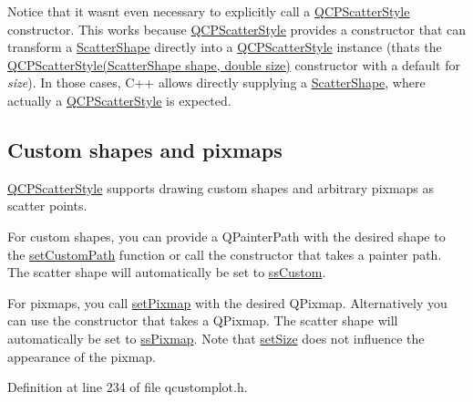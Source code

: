 \begin{DoxyCodeInclude}
\end{DoxyCodeInclude}
 Notice that it wasn\textquotesingle{}t even necessary to explicitly call a \hyperlink{class_q_c_p_scatter_style}{Q\+C\+P\+Scatter\+Style} constructor. This works because \hyperlink{class_q_c_p_scatter_style}{Q\+C\+P\+Scatter\+Style} provides a constructor that can transform a \hyperlink{class_q_c_p_scatter_style_adb31525af6b680e6f1b7472e43859349}{Scatter\+Shape} directly into a \hyperlink{class_q_c_p_scatter_style}{Q\+C\+P\+Scatter\+Style} instance (that\textquotesingle{}s the \hyperlink{class_q_c_p_scatter_style_a003d92f74f4561eda111862eadd62f28}{Q\+C\+P\+Scatter\+Style(\+Scatter\+Shape shape, double size)} constructor with a default for {\itshape size}). In those cases, C++ allows directly supplying a \hyperlink{class_q_c_p_scatter_style_adb31525af6b680e6f1b7472e43859349}{Scatter\+Shape}, where actually a \hyperlink{class_q_c_p_scatter_style}{Q\+C\+P\+Scatter\+Style} is expected.\hypertarget{class_q_c_p_scatter_style_QCPScatterStyle-custompath-and-pixmap}{}\subsection{Custom shapes and pixmaps}\label{class_q_c_p_scatter_style_QCPScatterStyle-custompath-and-pixmap}
\hyperlink{class_q_c_p_scatter_style}{Q\+C\+P\+Scatter\+Style} supports drawing custom shapes and arbitrary pixmaps as scatter points.

For custom shapes, you can provide a Q\+Painter\+Path with the desired shape to the \hyperlink{class_q_c_p_scatter_style_a96a3e949f90b2afe5677ca9412a12a1e}{set\+Custom\+Path} function or call the constructor that takes a painter path. The scatter shape will automatically be set to \hyperlink{class_q_c_p_scatter_style_adb31525af6b680e6f1b7472e43859349a15d9bcfd9de94edda949006529f9219d}{ss\+Custom}.

For pixmaps, you call \hyperlink{class_q_c_p_scatter_style_a5fb611d46acfac520d7b89a1c71d9246}{set\+Pixmap} with the desired Q\+Pixmap. Alternatively you can use the constructor that takes a Q\+Pixmap. The scatter shape will automatically be set to \hyperlink{class_q_c_p_scatter_style_adb31525af6b680e6f1b7472e43859349a8718b849ca7c307b07b8e091efb0c31e}{ss\+Pixmap}. Note that \hyperlink{class_q_c_p_scatter_style_aaefdd031052892c4136129db68596e0f}{set\+Size} does not influence the appearance of the pixmap. 

Definition at line 234 of file qcustomplot.\+h.



